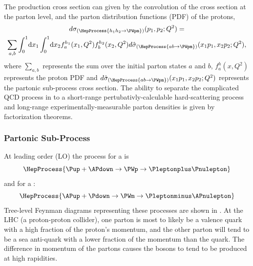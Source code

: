 The \PW production cross section can given by the convolution of the cross
section at the parton level, and the parton distribution functions (PDF) of the
protons,
\begin{multline}
  d\sigma_{(\HepProcess{h_1 h_2 \to \PWpm})}(p_1,p_2;Q^{2}) = \\
  \sum\limits_{a,b}
  \int_0^1 \! \mathrm{d} x_1 
  \int_0^1 \! \mathrm{d} x_2 
  f_a^{h_1}(x_1,Q^2)
  f_b^{h_2}(x_2,Q^2) 
  d\hat{\sigma}_{(\HepProcess{a b \to \PWpm})}(x_1 p_1, x_2 p_2; Q^2),
  \label{wbos:xsec}
\end{multline}
where $\sum\limits_{a,b}$ represents the sum over the initial parton states $a$
and $b$, $f_a^{h}(x,Q^2)$ represents the proton {PDF} and
$d\hat{\sigma}_{(\HepProcess{a b \to \PWpm})}(x_1 p_1, x_2 p_2; Q^2)$
represents the partonic sub-process cross section. The ability to separate the
complicated QCD process in to a short-range pertubativly-calculable
hard-scattering process and long-range experimentally-measurable parton
densities is given by factorization theorems. 

\subsubsection*{Partonic Sub-Process}

At leading order (LO) the process for a \PWp is
\begin{equation}
  \HepProcess{\Pup + \APdown \to \PWp \to \Pleptonplus \Pnulepton} 
  \label{wbos:wpprod} 
\end{equation}
and for a \PWm:
\begin{equation}
  \HepProcess{\APup + \Pdown \to \PWm \to \Pleptonminus \APnulepton}
  \label{wbos:wmprod} 
\end{equation}
Tree-level Feynman diagrams representing these processes are shown in
.
At the {LHC} (a proton-proton collider), one parton is most to likely be a
valence quark with a high fraction of the proton's momentum, and the other
parton will tend to be a sea anti-quark with a lower fraction of the momentum
than the quark. The difference in momentum of the partons causes the \PW bosons 
to tend to be produced at high rapidities. 

